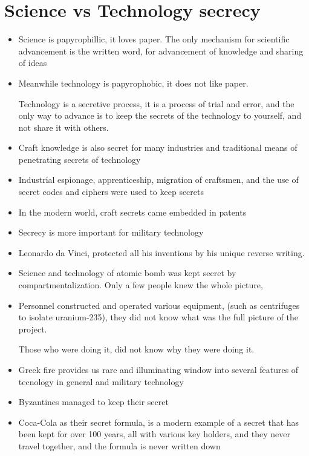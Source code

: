 \documentclass{article}
\begin{document}
\section{Science vs Technology secrecy}
\begin{itemize}
  \item Science is papyrophillic, it loves paper.
    The only mechanism for scientific advancement is the written word,
    for advancement of knowledge and sharing of ideas
  \item Meanwhile technology is papyrophobic, it does not like paper.

    Technology is a secretive process, it is a process of trial and error,
    and the only way to advance is to keep the secrets of the technology
    to yourself, and not share it with others.
  \item Craft knowledge is also secret for many industries and traditional
    means of penetrating secrets of technology
  \item Industrial espionage, apprenticeship, migration of craftsmen, and
    the use of secret codes and ciphers were used to keep secrets
  \item In the modern world, craft secrets came embedded in patents
  \item Secrecy is more important for military technology
  \item Leonardo da Vinci, protected all his inventions by his unique reverse writing.
  \item Science and technology of atomic bomb was kept secret by
    compartmentalization. Only a few people knew the whole picture,
  \item Personnel constructed and operated various equipment, (such as centrifuges to isolate uranium-235),
    they did not know what was the full picture of the project.

    Those who were doing it, did not know why they were doing it.
  \item Greek fire provides us rare and illuminating window into
    several features of tecnology in general and military technology
  \item Byzantines managed to keep their secret
  \item Coca-Cola as their secret formula, is a modern example of a secret
    that has been kept for over 100 years, all with various key holders,
    and they never travel together, and the formula is never written down


\end{itemize}
\end{document}
